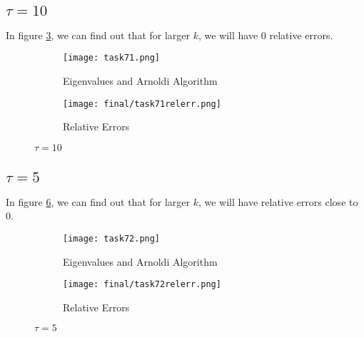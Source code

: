 \documentclass{article}
\begin{document}
\subsection{$\tau = 10$}
\begin{flushleft}
In figure \ref{fig:task71}, we can find out that for larger $k$, we will have $0$ relative errors.
\end{flushleft}
\begin{figure}[H]
    \centering
    \begin{subfigure}{0.8\textwidth}
        \centering
        \texttt{[image: task71.png]}
        \caption{Eigenvalues and Arnoldi Algorithm}
        \label{fig:task71e}
    \end{subfigure}
    \begin{subfigure}{0.5\textwidth}
        \centering
        \texttt{[image: final/task71relerr.png]}
        \caption{Relative Errors}
        \label{fig:task71relerr}
    \end{subfigure}
    \caption{$\tau=10$}
    \label{fig:task71}
\end{figure}
\subsection{$\tau = 5$}
\begin{flushleft}
In figure \ref{fig:task72}, we can find out that for larger $k$, we will have relative errors close to $0$.
\end{flushleft}
\begin{figure}[H]
    \centering
    \begin{subfigure}{0.8\textwidth}
        \centering
        \texttt{[image: task72.png]}
        \caption{Eigenvalues and Arnoldi Algorithm}
        \label{fig:task72e}
    \end{subfigure}
    \begin{subfigure}{0.5\textwidth}
        \centering
        \texttt{[image: final/task72relerr.png]}
        \caption{Relative Errors}
        \label{fig:task72relerr}
    \end{subfigure}
    \caption{$\tau=5$}
    \label{fig:task72}
\end{figure}
\end{document}
